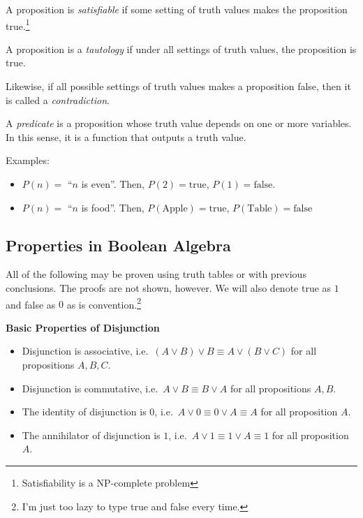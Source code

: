 \bigskip
\begin{definition}
    A proposition is \emph{satisfiable} if some setting of truth values makes the proposition true.\footnote{Satisfiability is a NP-complete problem}
\end{definition}

\bigskip
\begin{definition}
    A proposition is a \emph{tautology} if under all settings of truth values, the proposition is true.
\end{definition}

Likewise, if all possible settings of truth values makes a proposition false, then it is called a \emph{contradiction}.

\bigskip
\begin{definition}
    A \emph{predicate} is a proposition whose truth value depends on one or more variables. In this sense, it is a function that outputs a truth value.
\end{definition}

Examples:
\begin{itemize}
    \item \(P(n)=\) ``\(n\) is even''. Then, \(P(2)=\text{true}\), \(P(1)=\text{false}\).
    \item \(P(n)=\) ``\(n\) is food''. Then, \(P(\text{Apple})=\text{true}\), \(P(\text{Table})=\text{false}\)
\end{itemize}

\subsection{Properties in Boolean Algebra}

All of the following may be proven using truth tables or with previous conclusions. The proofs are not shown, however.
We will also denote true as \(1\) and false as \(0\) as is convention.\footnote{I'm just too lazy to type true and false every time.}

\begin{proposition} 
    \textbf{Basic Properties of Disjunction}
    \begin{itemize}
        \item Disjunction is associative, i.e.\ \((A\lor B)\lor B\equiv A\lor(B\lor C)\) for all propositions \(A,B,C\).
        \item Disjunction is commutative, i.e.\ \(A\lor B\equiv B\lor A\) for all propositions \(A,B\).
        \item The identity of disjunction is \(0\), i.e.\ \(A\lor0\equiv 0\lor A\equiv A\) for all proposition \(A\).
        \item The annihilator of disjunction is \(1\), i.e.\ \(A\lor1\equiv 1\lor A\equiv 1\) for all proposition \(A\).
    \end{itemize}
\end{proposition}

